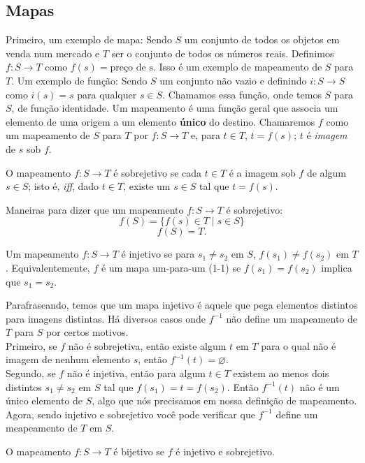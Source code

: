 \subsection{Mapas}
Primeiro, um exemplo de mapa: Sendo $S$ um conjunto de todos os objetos em venda num mercado e $T$ ser o conjunto de todos os números reais. Definimos $f:S \to T$ como $f(s) = \textrm{preço de s}$. Isso é um exemplo de mapeamento de $S$ para $T$.
Um exemplo de função: Sendo $S$ um conjunto não vazio e definindo $i:S \to S$ como $i(s) = s$ para qualquer $s \in S$. Chamamos essa função, onde temos $S$ para $S$, de função identidade.\newline
Um mapeamento é uma função geral que associa um elemento de uma origem a um elemento \textbf{único} do destino. Chamaremos $f$ como um mapeamento de $S$ para $T$ por $f:S \to T$ e, para $t \in T$, $t = f(s)$; $t$ é \textit{imagem} de $s$ sob $f$.
\begin{definition}
	O mapeamento $f:S \to T$ é sobrejetivo se cada $t \in T$ é a imagem sob $f$ de algum $s \in S$; isto é, \textit{iff}, dado $t \in T$, existe um $s \in S$ tal que $t = f(s)$.
\end{definition}
Maneiras para dizer que um mapeamento $f: S \to T$ é sobrejetivo:
$$f(S) = \{f(s) \in T \mid s \in S\}$$
$$f(S) = T.$$
\begin{definition}
	Um mapeamento $f: S \to T$ é injetivo se para $s_{1} \neq s_{2}$ em $S$, $f(s_{1}) \neq f(s_{2})$ em $T$. Equivalentemente, $f$ é um mapa um-para-um (1-1) se $f(s_{1}) = f(s_{2})$ implica que $s_{1} = s_{2}$.
\end{definition}
Parafraseando, temos que um mapa injetivo é aquele que pega elementos distintos para imagens distintas.\newline
Há diversos casos onde $f^{-1}$ não define um mapeamento de $T$ para $S$ por certos motivos.\\
Primeiro, se $f$ não é sobrejetiva, então existe algum $t$ em $T$ para o qual não é imagem de nenhum elemento $s$, então $f^{-1}(t)=\varnothing$.\\
Segundo, se $f$ não é injetiva, então para algum $t \in T$ existem ao menos dois distintos $s_{1} \neq s_{2}$ em $S$ tal que $f(s_{1}) = t = f(s_{2})$. Então $f^{-1}(t)$ não é um único elemento de $S$, algo que nós precisamos em nossa definição de mapeamento. Agora, sendo injetivo e sobrejetivo você pode verificar que $f^{-1}$ define um meapeamento de $T$ em $S$.
\begin{definition}
    O mapeamento $f:S \to T$ é bijetivo se $f$ é injetivo e sobrejetivo.
\end{definition}
